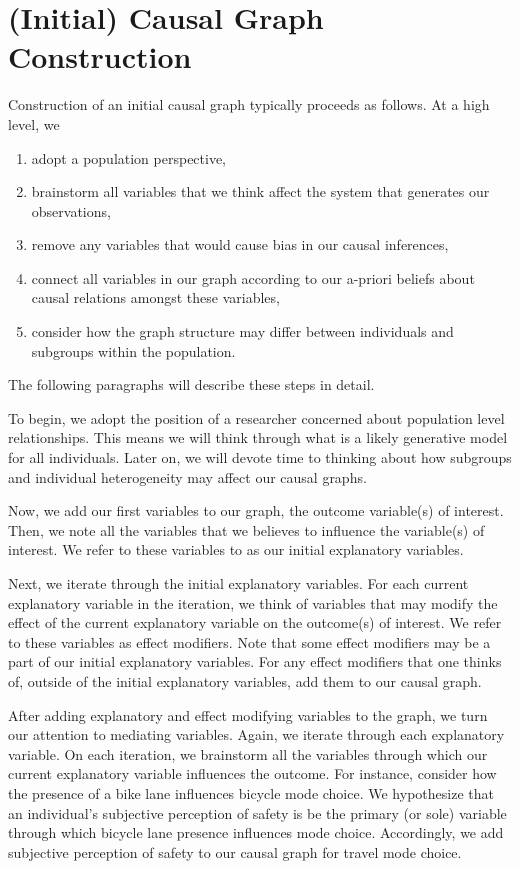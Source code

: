 \section{(Initial) Causal Graph Construction}

Construction of an initial causal graph typically proceeds as follows.
At a high level, we
\begin{enumerate}
   \item adopt a population perspective,
   \item brainstorm all variables that we think affect the system that generates our observations,
   \item remove any variables that would cause bias in our causal inferences,
   \item connect all variables in our graph according to our a-priori beliefs about causal relations amongst these variables,
   \item consider how the graph structure may differ between individuals and subgroups within the population.
\end{enumerate}
The following paragraphs will describe these steps in detail.

To begin, we adopt the position of a researcher concerned about population level relationships.
This means we will think through what is a likely generative model for all individuals.
Later on, we will devote time to thinking about how subgroups and individual heterogeneity may affect our causal graphs.

Now, we add our first variables to our graph, the outcome variable(s) of interest.
Then, we note all the variables that we believes to influence the variable(s) of interest.
We refer to these variables to as our initial explanatory variables.

Next, we iterate through the initial explanatory variables.
For each current explanatory variable in the iteration, we think of variables that may modify the effect of the current explanatory variable on the outcome(s) of interest.
We refer to these variables as effect modifiers.
Note that some effect modifiers may be a part of our initial explanatory variables.
For any effect modifiers that one thinks of, outside of the initial explanatory variables, add them to our causal graph.

After adding explanatory and effect modifying variables to the graph, we turn our attention to mediating variables.
Again, we iterate through each explanatory variable.
On each iteration, we brainstorm all the variables through which our current explanatory variable influences the outcome.
For instance, consider how the presence of a bike lane influences bicycle mode choice.
We hypothesize that an individual's subjective perception of safety is be the primary (or sole) variable through which bicycle lane presence influences mode choice.
Accordingly, we add subjective perception of safety to our causal graph for travel mode choice.

